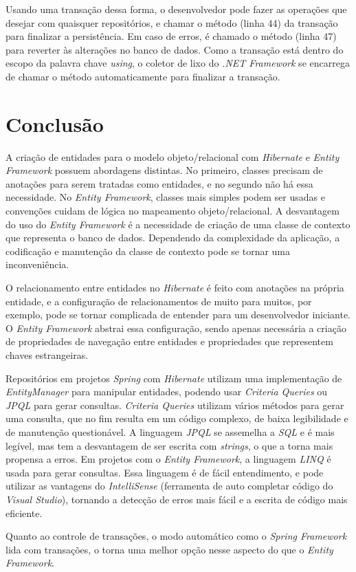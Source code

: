 Usando uma transação dessa forma, o desenvolvedor pode fazer as operações que desejar com quaisquer repositórios, e chamar o método  (linha 44) da transação para finalizar a persistência. Em caso de erros, é chamado o método  (linha 47) para reverter às alterações no banco de dados. Como a transação está dentro do escopo da palavra chave \textit{using}, o coletor de lixo do \textit{.NET Framework} se encarrega de chamar o método  automaticamente para finalizar a transação.


\section{Conclusão}

A criação de entidades para o modelo objeto/relacional com \textit{Hibernate} e \textit{Entity Framework} possuem abordagens distintas. No primeiro, classes precisam de anotações para serem tratadas como entidades, e no segundo não há essa necessidade. No \textit{Entity Framework}, classes mais simples podem ser usadas e convenções cuidam de lógica no mapeamento objeto/relacional. A desvantagem do uso do \textit{Entity Framework} é a necessidade de criação de uma classe de contexto que representa o banco de dados. Dependendo da complexidade da aplicação, a codificação e manutenção da classe de contexto pode se tornar uma inconveniência.

O relacionamento entre entidades no \textit{Hibernate} é feito com anotações na própria entidade, e a configuração de relacionamentos de muito para muitos, por exemplo, pode se tornar complicada de entender para um desenvolvedor iniciante. O \textit{Entity Framework} abstrai essa configuração, sendo apenas necessária a criação de propriedades de navegação entre entidades e propriedades que representem chaves estrangeiras.

Repositórios em projetos \textit{Spring} com \textit{Hibernate} utilizam uma implementação de \textit{EntityManager} para manipular entidades, podendo usar \textit{Criteria Queries} ou \textit{JPQL} para gerar consultas. \textit{Criteria Queries} utilizam vários métodos para gerar uma consulta, que no fim resulta em um código complexo, de baixa legibilidade e de manutenção questionável. A linguagem \textit{JPQL} se assemelha a \textit{SQL} e é mais legível, mas tem a desvantagem de ser escrita com \textit{strings}, o que a torna mais propensa a erros. Em projetos com o \textit{Entity Framework}, a linguagem \textit{LINQ} é usada para gerar consultas. Essa linguagem é de fácil entendimento, e pode utilizar as vantagens do \textit{IntelliSense} (ferramenta de auto completar código do \textit{Visual Studio}), tornando a detecção de erros mais fácil e a escrita de código mais eficiente.

Quanto ao controle de transações, o modo automático como o \textit{Spring Framework} lida com transações, o torna uma melhor opção nesse aspecto do que o \textit{Entity Framework}. 